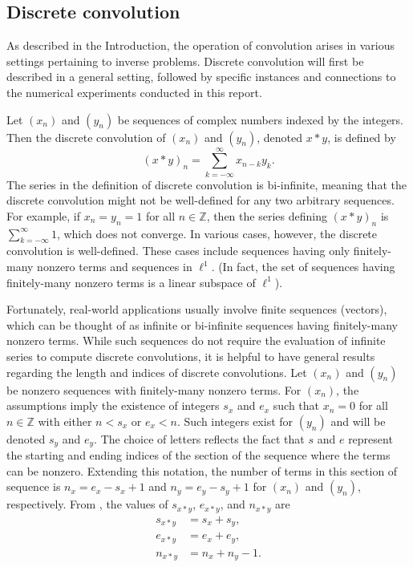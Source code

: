 \documentclass[12pt]{article}
\begin{document}
\subsection{Discrete convolution} \label{Discrete convolution}
As described in the Introduction, the operation of convolution arises in various settings pertaining to inverse problems. Discrete convolution will first be described  in a general setting, followed by specific instances and connections to the numerical experiments conducted in this report. \par
Let $(x_n)$ and $(y_n)$ be sequences of complex numbers indexed by the integers. Then the discrete convolution of $(x_n)$ and $(y_n)$, denoted $x*y$, is defined by
\[(x*y)_n = \sum_{k=-\infty}^\infty x_{n-k}y_k.\]
The series in the definition of discrete convolution is bi-infinite, meaning that the discrete convolution might not be well-defined for any two arbitrary sequences. For example, if $x_n = y_n = 1$ for all $n \in \mathbb{Z}$, then the series defining $(x*y)_n$ is $\sum_{k=-\infty}^\infty 1$, which does not converge. In various cases, however, the discrete convolution is well-defined. These cases include sequences having only finitely-many nonzero terms and sequences in $\ell^1$. (In fact, the set of sequences having finitely-many nonzero terms is a linear subspace of $\ell^1$).  \par 
Fortunately, real-world applications usually involve finite sequences (vectors), which can be thought of as infinite or bi-infinite sequences having finitely-many nonzero terms. While such sequences do not require the evaluation of infinite series to compute discrete convolutions, it is helpful to have general results regarding the length and indices of discrete convolutions. Let $(x_n)$ and $(y_n)$ be nonzero sequences with finitely-many nonzero terms. For $(x_n)$, the assumptions imply the existence of integers $s_x$ and $e_x$ such that $x_n = 0$ for all $n \in \mathbb{Z}$ with either $n < s_x$ or $e_x < n$. Such integers exist for $(y_n)$ and will be denoted $s_y$ and $e_y$. The choice of letters reflects the fact that $s$ and $e$ represent the starting and ending indices of the section of the sequence where the terms can be nonzero. Extending this notation, the number of terms in this section of sequence is $n_x = e_x - s_x + 1$ and $n_y = e_y - s_y + 1$ for $(x_n)$ and $(y_n)$, respectively. From \cite{BoggessAlbert2001Afci}, the values of $s_{x*y}$, $e_{x*y}$, and $n_{x*y}$ are
\begin{align}
s_{x*y} &= s_x + s_y, \nonumber \\
e_{x*y} &= e_x + e_y, \label{Eq_ConResults} \\
n_{x*y} &= n_x + n_y - 1. \nonumber
\end{align}
\end{document}
